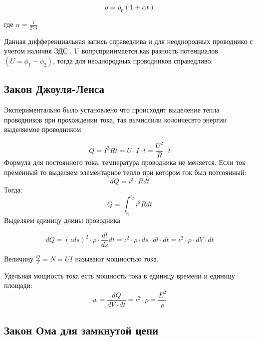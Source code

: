 \documentclass[../main.tex]{subfiles}
\begin{document}
\[\rho = \rho_0 (1 + \alpha t)\]
\begin{center}
    где $\alpha = \frac{1}{273}$
\end{center}

Данная дифференциальная запись справедлива и для неоднородных проводнико с учетом наличия ЭДС , U вопрспринимается как разность потенциалов $(U = \phi_1 - \phi_2)$, тогда 
для неоднородных проводников справедливо:

\vspace{5px}



\subsection{Закон Джоуля-Ленса}
Экспериментально было установлено что происходит  выделение тепла проводников при прохождении тока, так вычислили колоичесвто энергии выделяемое проводником

\[ Q = I^2 R t = U \cdot I \cdot t = \frac{U^2}{R} \cdot t\]
Формула для постоянного тока, температура проводника не меняется. Если ток пременный то выделяем элементарное тепло при котором ток был потсоянный:
\[dQ = i^2 \cdot R dt\]
Тогда:
\[Q = \int_{t_1}^{t_2} i^2 R dt\]
Выделяем единицу длины проводника

\[dQ = (\iota ds)^2 \cdot \rho \cdot \frac{dl}{ds} dt  = \iota^2 \cdot \rho \cdot ds \cdot dl \cdot dt =\iota^2 \cdot \rho \cdot dV \cdot dt \]

 Величину $\frac{Q}{t} = N = UI$ называют мощностью тока.

 Удельная мощность тока есть мощность тока в единицу времени и единицу площади:
\[w = \frac{dQ}{dV \cdot dt} = \iota^2 \cdot \rho = \frac{E^2}{\rho}\]

\subsection{Закон Ома для замкнутой цепи}
\end{document}
